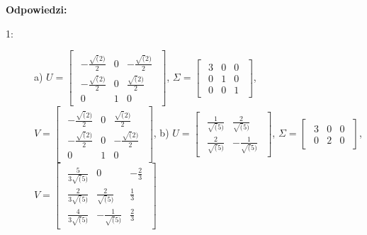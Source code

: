 \documentclass{article}
\begin{document}
\newpage
\textbf{Odpowiedzi:}
\begin{description}
    \item [1:] a) $U = \begin{bmatrix}\begin{array}{ccc} -\frac{\sqrt(2)}{2} & 0 & -\frac{\sqrt(2)}{2}\\ -\frac{\sqrt(2)}{2} & 0 & \frac{\sqrt(2)}{2}\\ 0 & 1 & 0 \end{array}\end{bmatrix}$, $\Sigma = \begin{bmatrix}\begin{array}{ccc} 3 & 0 & 0\\ 0 & 1 & 0\\ 0 & 0 & 1 \end{array}\end{bmatrix}$, $V = \begin{bmatrix}\begin{array}{ccc} -\frac{\sqrt(2)}{2} & 0 & \frac{\sqrt(2)}{2}\\ -\frac{\sqrt(2)}{2} & 0 & -\frac{\sqrt(2)}{2}\\ 0 & 1 & 0 \end{array}\end{bmatrix}$,
    b) $U = \begin{bmatrix}\begin{array}{cc} \frac{1}{\sqrt(5)} & \frac{2}{\sqrt(5)}\\ \frac{2}{\sqrt(5)} & -\frac{1}{\sqrt(5)} \end{array}\end{bmatrix}$, $\Sigma = \begin{bmatrix}\begin{array}{ccc} 3 & 0 & 0\\ 0 & 2 & 0 \end{array}\end{bmatrix}$, $V = \begin{bmatrix}\begin{array}{rrr} \frac{5}{3\sqrt(5)} & 0 & -\frac{2}{3}\\ \frac{2}{3\sqrt(5)} & \frac{2}{\sqrt(5)} & \frac{1}{3}\\ \frac{4}{3\sqrt(5)} & -\frac{1}{\sqrt(5)} & \frac{2}{3} \end{array}\end{bmatrix}$


\end{description}
\end{document}
